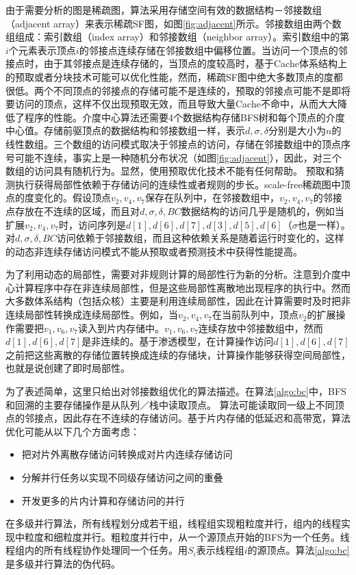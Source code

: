 \begin{flushleft}
由于需要分析的图是稀疏图，算法采用存储空间有效的数据结构－邻接数组（adjacent array）来表示稀疏SF图，如图\ref{fig:adjacent}所示。邻接数组由两个数组组成：索引数组（index array）和邻接数组（neighbor array）。索引数组中的第$i$个元素表示顶点$i$的邻接点连续存储在邻接数组中偏移位置。当访问一个顶点的邻接点时，由于其邻接点是连续存储的，当顶点的度较高时，基于Cache体系结构上的预取或者分块技术可能可以优化性能，然而，稀疏SF图中绝大多数顶点的度都很低。两个不同顶点的邻接点的存储可能不是连续的，预取的邻接点可能不是即将要访问的顶点，这样不仅出现预取无效，而且导致大量Cache不命中，从而大大降低了程序的性能。介度中心算法还需要4个数据结构存储BFS树和每个顶点的介度中心值。存储前驱顶点的数据结构和邻接数组一样，表示$d, \sigma, \delta$分别是大小为$n$的线性数组。三个数组的访问模式取决于邻接点的访问，存储在邻接数组中的顶点序号可能不连续，事实上是一种随机分布状况（如图\ref{fig:adjacent}），因此，对三个数组的访问具有随机行为。显然，使用预取优化技术不能有任何帮助。
预取和猜测执行获得局部性依赖于存储访问的连续性或者规则的步长。scale-free稀疏图中顶点的度变化的。假设顶点$v_{2}, v_{4}, v_{7}$保存在队列中，在邻接数组中，$v_{2}, v_{4}, v_{7}$的邻接点存放在不连续的区域，而且对$d,\sigma,\delta, BC$数据结构的访问几乎是随机的，例如当扩展$v_{2}, v_{4}, v_{7}$时，访问序列是$d[1],d[6],d[7],d[3],d[5],d[6]$（$\sigma$也是一样）。对$d,\sigma,\delta, BC$访问依赖于邻接数组，而且这种依赖关系是随着运行时变化的，这样的动态非连续存储访问模式不能从预取或者预测技术中获得性能提高。

为了利用动态的局部性，需要对非规则计算的局部性行为新的分析。注意到介度中心计算程序中存在非连续局部性，但是这些局部性离散地出现程序的执行中。然而大多数体系结构（包括众核）主要是利用连续局部性，因此在计算需要时及时把非连续局部性转换成连续局部性。例如，当$v_{2}, v_{4}, v_{7}$在当前队列中，顶点$v_{2}$的扩展操作需要把$v_{1}, v_{6}, v_{7}$读入到片内存储中。$v_{1}, v_{6}, v_{7}$连续存放中邻接数组中，然而$d[1],d[6],d[7]$是非连续的。基于渗透模型，在计算操作访问$d[1],d[6],d[7]$之前把这些离散的存储位置转换成连续的存储块，计算操作能够获得空间局部性，也就是说创建了即时局部性。

为了表述简单，这里只给出对邻接数组优化的算法描述。在算法\ref{algo:bc}中，BFS和回溯的主要存储操作是从队列／栈中读取顶点。
算法可能读取同一级上不同顶点的邻接点，因此存在不连续的存储访问。基于片内存储的低延迟和高带宽，算法优化可能从以下几个方面考虑：
\begin{itemize}
	\item 把对片外离散存储访问转换成对片内连续存储访问
	\item 分解并行任务以实现不同级存储访问之间的重叠
	\item 开发更多的片内计算和存储访问的并行
\end{itemize}
在多级并行算法，所有线程划分成若干组，线程组实现粗粒度并行，组内的线程实现中粒度和细粒度并行。粗粒度并行中，从一个源顶点开始的BFS为一个任务。线程组内的所有线程协作处理同一个任务。用$S_{i}$表示线程组$i$的源顶点。算法\ref{algo:bc}是多级并行算法的伪代码。


\end{flushleft}
